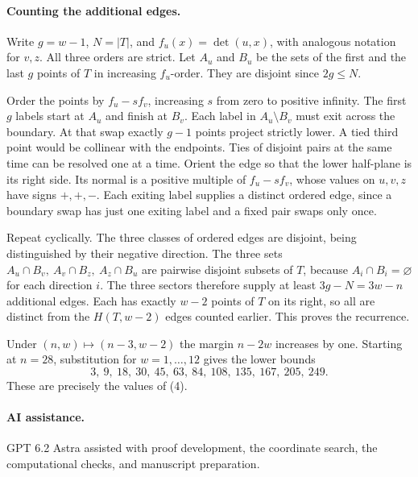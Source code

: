 \documentclass[11pt]{article}
\begin{document}
\paragraph{Counting the additional edges.}
Write \(g=w-1\), \(N=|T|\), and \(f_u(x)=\det(u,x)\), with analogous
notation for \(v,z\). All three orders are strict. Let \(A_u\) and
\(B_u\) be the sets of the first and the last \(g\) points of \(T\)
in increasing \(f_u\)-order. They are disjoint since \(2g\le N\).

Order the points by \(f_u-sf_v\), increasing \(s\) from zero to
positive infinity. The first \(g\) labels start at \(A_u\) and finish
at \(B_v\). Each label in \(A_u\setminus B_v\) must exit across the
boundary. At that swap exactly \(g-1\) points project strictly lower.
A tied third point would be collinear with the endpoints. Ties of
disjoint pairs at the same time can be resolved one at a time.
Orient the edge so that the lower half-plane is its right side.
Its normal is a positive multiple of \(f_u-sf_v\), whose values on
\(u,v,z\) have signs \(+,+,-\). Each exiting label supplies a distinct
ordered edge, since a boundary swap has just one exiting label and
a fixed pair swaps only once.

Repeat cyclically. The three classes of ordered edges are disjoint,
being distinguished by their negative direction. The three sets
\(A_u\cap B_v,\ A_v\cap B_z,\ A_z\cap B_u\) are pairwise disjoint
subsets of \(T\), because \(A_i\cap B_i=\varnothing\) for each direction
\(i\). The three sectors therefore supply at least \(3g-N=3w-n\)
additional edges. Each has exactly \(w-2\) points of \(T\) on its right,
so all are distinct from the \(H(T,w-2)\) edges counted earlier.
This proves the recurrence.

Under \((n,w)\mapsto(n-3,w-2)\) the margin \(n-2w\) increases by one.
Starting at \(n=28\), substitution for \(w=1,\ldots,12\) gives the
lower bounds
\[
  3,\ 9,\ 18,\ 30,\ 45,\ 63,\ 84,\ 108,\ 135,\ 167,\ 205,\ 249 .
\]
These are precisely the values of (4).

\paragraph{AI assistance.}
GPT 6.2 Astra assisted with proof development, the coordinate search, the computational checks, and manuscript preparation.
\end{document}
